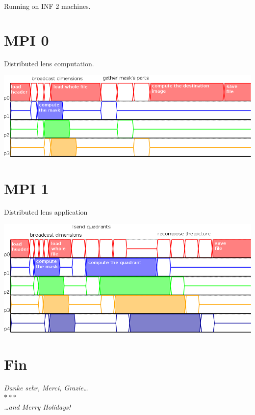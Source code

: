 \documentclass[12pt]{article}
\begin{document}
\small Running on INF 2 machines.

\section{MPI 0}

Distributed lens computation.

\begin{center}
\includegraphics[width=.8\textwidth]{../figures/mpi0.png}
\end{center}

\section{MPI 1}

Distributed lens application

\begin{center}
\includegraphics[width=.8\textwidth]{../figures/mpi1.png}
\end{center}


\section{Fin}
\vspace{4cm}
\begin{center}
\emph{Danke sehr, Merci, Grazie… \\ $* * *$ \\ …and Merry Holidays!}
\end{center}
\end{document}
